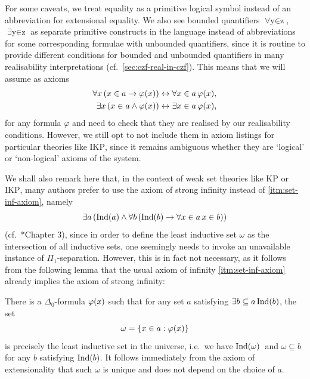 \documentclass[12pt,openany]{book}
\theoremstyle{plain}
\theoremstyle{definition}
\newcommand\opA[1]{\mathop{\forall #1}}
\newcommand\opE[1]{\mathop{\exists #1}}
\DeclareMathOperator\Ind{Ind}
\newcommand\KP{\mathrm{KP}}
\newcommand\IKP{\mathrm{IKP}}
\begin{document}
For some caveats, we treat equality as a primitive logical symbol instead of an abbreviation for extensional equality. We also see bounded quantifiers $\opA{y \in z}$, $\opE{y \in z}$ as separate primitive constructs in the language instead of abbreviations for some corresponding formulae with unbounded quantifiers, since it is routine to provide different conditions for bounded and unbounded quantifiers in many realisability interpretations (cf.\ \autoref{sec:czf-real-in-czf}). This means that we will assume as axioms
\begin{align*}
  \opA{x} \left(x \in a \rightarrow \varphi\mleft(x\mright)\right) & \leftrightarrow \opA{x \in a} \varphi\mleft(x\mright), \\
  \opE{x} \left(x \in a \land \varphi\mleft(x\mright)\right)       & \leftrightarrow \opE{x \in a} \varphi\mleft(x\mright),
\end{align*}
for any formula $\varphi$ and need to check that they are realised by our realisability conditions. However, we still opt to not include them in axiom listings for particular theories like $\IKP$, since it remains ambiguous whether they are `logical' or `non-logical' axioms of the system.

We shall also remark here that, in the context of weak set theories like $\KP$ or $\IKP$, many authors prefer to use the axiom of strong infinity instead of \ref{itm:set-inf-axiom}, namely
\[\opE{a} \left(\Ind\mleft(a\mright) \land \opA{b} \left(\Ind\mleft(b\mright) \rightarrow \opA{x \in a} x \in b\right)\right)\]
(cf.\ \cite{aczel-rathjen10-cst-book}*{Chapter 3}), since in order to define the least inductive set $\omega$ as the intersection of all inductive sets, one seemingly needs to invoke an unavailable instance of $\Pi_1$-separation. However, this is in fact not necessary, as it follows from the following lemma that the usual axiom of infinity \ref{itm:set-inf-axiom} already implies the axiom of strong infinity:
\begin{lemma}[$\IKP$]
  \label{lem:ikp-omega-from-inf}
  There is a $\Delta_0$-formula $\varphi\mleft(x\mright)$ such that for any set $a$ satisfying $\opE{b \subseteq a} \Ind\mleft(b\mright)$, the set
  \[\omega = \left\{x \in a : \varphi\mleft(x\mright)\right\}\]
  is precisely the least inductive set in the universe, i.e.\ we have $\Ind\mleft(\omega\mright)$\ and $\omega \subseteq b$ for any $b$ satisfying $\Ind\mleft(b\mright)$. It follows immediately from the axiom of extensionality that such $\omega$ is unique and does not depend on the choice of $a$.
\end{lemma}
\end{document}
